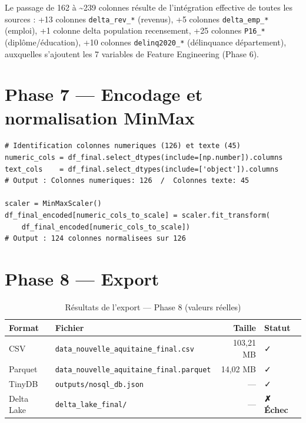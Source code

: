 \documentclass[12pt,a4paper,oneside]{report}
\newcommand{\code}[1]{\texttt{\small #1}}
\begin{document}
\begin{infobox}
Le passage de 162 à \textasciitilde{}239 colonnes résulte de l'intégration effective de toutes les sources : +13 colonnes \code{delta\_rev\_*} (revenus), +5 colonnes \code{delta\_emp\_*} (emploi), +1 colonne delta population recensement, +25 colonnes \code{P16\_*} (diplôme/éducation), +10 colonnes \code{delinq2020\_*} (délinquance département), auxquelles s'ajoutent les 7 variables de Feature Engineering (Phase 6).
\end{infobox}

\section{Phase 7 — Encodage et normalisation MinMax}

\begin{lstlisting}[caption={Normalisation MinMax — Phase 7 (sortie réelle)}]
# Identification colonnes numeriques (126) et texte (45)
numeric_cols = df_final.select_dtypes(include=[np.number]).columns
text_cols    = df_final.select_dtypes(include=['object']).columns
# Output : Colonnes numeriques: 126  /  Colonnes texte: 45

scaler = MinMaxScaler()
df_final_encoded[numeric_cols_to_scale] = scaler.fit_transform(
    df_final_encoded[numeric_cols_to_scale])
# Output : 124 colonnes normalisees sur 126
\end{lstlisting}

\section{Phase 8 — Export}

\begin{table}[H]
  \centering
  \caption{Résultats de l'export — Phase 8 (valeurs réelles)}
  \label{tab:export}
  \begin{tabular}{llrl}
    \toprule
    \textbf{Format} & \textbf{Fichier} & \textbf{Taille} & \textbf{Statut} \\
    \midrule
    CSV     & \texttt{data\_nouvelle\_aquitaine\_final.csv}     & 103,21 MB & ✓ \\
    Parquet & \texttt{data\_nouvelle\_aquitaine\_final.parquet} & 14,02 MB  & ✓ \\
    TinyDB  & \texttt{outputs/nosql\_db.json}                   & —         & ✓ \\
    Delta Lake & \texttt{delta\_lake\_final/}                  & —         & \textbf{✗ Échec} \\
    \bottomrule
  \end{tabular}
\end{table}
\end{document}

